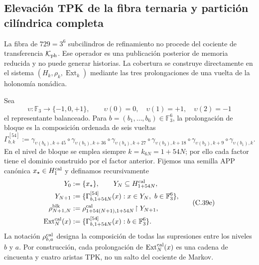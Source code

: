 \subsection{Elevación TPK de la fibra ternaria y partición cilíndrica completa}
\label{subsec:elevacion-catalogal-ch}

La fibra de \(729=3^6\) subcilindros de refinamiento no procede del cociente de transferencia
\(\mathcal K_{\rm ph}\). Ese operador es una publicación posterior de memoria
reducida y no puede generar historias. La cobertura se construye directamente
en el sistema \((H_k,\rho_k,\operatorname{Ext}_k)\) mediante las tres
prolongaciones de una vuelta de la holonomía nonádica.





Sea
\[
 \upsilon:\mathbb F_3\longrightarrow\{-1,0,+1\},\qquad
 \upsilon(0)=0,\quad\upsilon(1)=+1,\quad\upsilon(2)=-1
\]
el representante balanceado. Para
\(b=(b_1,\ldots,b_6)\in\mathbb F_3^6\), la prolongación de bloque es la
composición ordenada de seis vueltas
\[
 \Gamma_{b,k}^{[54]}:=
 \gamma_{\upsilon(b_6),k+45}\circ\gamma_{\upsilon(b_5),k+36}\circ
 \gamma_{\upsilon(b_4),k+27}\circ\gamma_{\upsilon(b_3),k+18}\circ
 \gamma_{\upsilon(b_2),k+9}\circ\gamma_{\upsilon(b_1),k}.
\tag{C.39d}
\label{eq:gamma-bloque-54-ch}
\]
En el nivel de bloque se emplea siempre
\(k=k_{6N}=1+54N\); por ello cada factor tiene el dominio construido por el
factor anterior.
Fijemos una semilla APP canónica \(x_\star\in H^{\rm cal}_1\) y definamos
recursivamente
\[
 \begin{aligned}
  Y_0&:=\{x_\star\},\qquad Y_N\subseteq H_{1+54N}^{\rm cal},\\
  Y_{N+1}&:=\{\Gamma_{b,1+54N}^{[54]}(x):
                 x\in Y_N,\ b\in\mathbb F_3^6\},\\
  \rho^{\rm blk}_{N+1,N}
    &:=\rho^{\rm cal}_{1+54(N+1),1+54N}
       \!\upharpoonright Y_{N+1},\\
  \operatorname{Ext}^{\rm cal}_N(x)
    &:=\{\Gamma_{b,1+54N}^{[54]}(x):b\in\mathbb F_3^6\}.
 \end{aligned}
\tag{C.39e}
\label{eq:sincronizacion-54-ch}
\]
La notación \(\rho^{\rm cal}_{b,a}\) designa la composición de todas las supresiones
entre los niveles \(b\) y \(a\). Por construcción, cada prolongación de
\(\operatorname{Ext}^{\rm cal}_N(x)\) es una cadena de cincuenta y cuatro
aristas TPK, no un salto del cociente de Markov.

